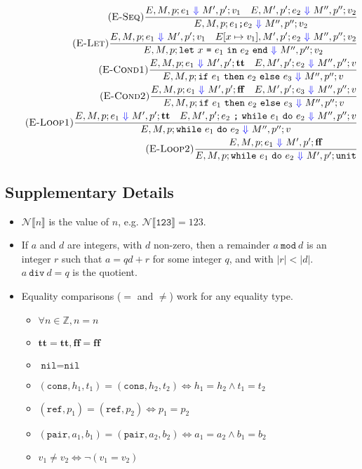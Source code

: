 \documentclass{article}
\newcommand{\btt}{\mathbf{tt}}
\newcommand{\bff}{\mathbf{ff}}
\newcommand{\To}{\ \textcolor{blue}{\Downarrow}\ }
\begin{document}
\begin{align*}
\tag{\sc E-Seq}
\frac{E,M,p;e_1\To M',p';v_1 \quad E,M',p';e_2\To M'',p'';v_2}
{E,M,p;e_1 \texttt{;} e_2\To M'',p'';v_2}
\\
\tag{\sc E-Let}
\frac{E,M,p;e_1\To M',p';v_1 \quad E[x\mapsto v_1],M',p';e_2\To M'',p'';v_2}
{E,M,p;\texttt{let}\ x\ \texttt{=}\ e_1\ \texttt{in}\ e_2\ \texttt{end}\To M'',p'';v_2}
\\
\tag{\sc E-Cond1}
\frac{E,M,p;e_1\To M',p';\btt \quad E,M',p';e_2\To M'',p'';v}
{E,M,p;\texttt{if}\ e_1\ \texttt{then}\ e_2\ \texttt{else}\ e_3\To M'',p'';v}
\\
\tag{\sc E-Cond2}
\frac{E,M,p;e_1\To M',p';\bff \quad E,M',p';e_3\To M'',p'';v}
{E,M,p;\texttt{if}\ e_1\ \texttt{then}\ e_2\ \texttt{else}\ e_3\To M'',p'';v}
\\
\tag{\sc E-Loop1}
\frac{E,M,p;e_1\To M',p';\btt \quad E,M',p';e_2\ \texttt{;}\ \texttt{while}\ e_1\ \texttt{do}\ e_2\To M'',p'';v}
{E,M,p;\texttt{while}\ e_1\ \texttt{do}\ e_2\To M'',p'';v}
\\
\tag{\sc E-Loop2}
\frac{E,M,p;e_1\To M',p';\bff}
{E,M,p;\texttt{while}\ e_1\ \texttt{do}\ e_2\To M',p';\texttt{unit}}
\end{align*}

\subsection{Supplementary Details}

\begin{itemize}
  \item $\mathcal{N}\llbracket n\rrbracket$ is the value of $n$, e.g. $\mathcal{N}\llbracket\texttt{123}\rrbracket = 123$.
  \item If $a$ and $d$ are integers, with $d$ non-zero, then a remainder $a\ \texttt{mod}\ d$ is an integer $r$ such that $a = qd + r$ for some integer $q$, and with $|r| < |d|$.  $a\ \texttt{div}\ d = q$ is the quotient.
  \item Equality comparisons ($=$ and $\ne$) work for any equality type.
  \begin{itemize}
    \item $\forall n\in\mathbb{Z}, n=n$
    \item $\btt=\btt, \bff=\bff$
    \item $\texttt{nil}=\texttt{nil}$
    \item $(\texttt{cons},h_1,t_1)=(\texttt{cons},h_2,t_2) \iff h_1=h_2\land t_1=t_2$
    \item $(\texttt{ref},p_1)=(\texttt{ref},p_2) \iff p_1=p_2$
    \item $(\texttt{pair},a_1,b_1)=(\texttt{pair},a_2,b_2) \iff a_1=a_2\land b_1=b_2$
    \item $v_1\ne v_2 \iff \lnot(v_1=v_2)$
  \end{itemize}
\end{itemize}
\end{document}
